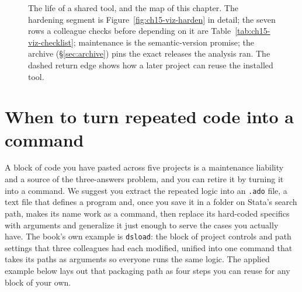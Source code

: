 \documentclass[
    a4paper,
    fontsize=10pt,
    twoside=true,
    numbers=noenddot,
]{kaobook}
\begin{document}
\begin{figure}[htbp]
\centering
{}
\caption[The life of a shared tool]{The life of a shared tool, and the map of this chapter. The hardening segment is Figure~\ref{fig:ch15-viz-harden} in detail; the seven rows a colleague checks before depending on it are Table~\ref{tab:ch15-viz-checklist}; maintenance is the semantic-version promise; the archive (\S\ref{sec:archive}) pins the exact releases the analysis ran. The dashed return edge shows how a later project can reuse the installed tool.}
\label{fig:ch15-viz-lifecycle}
\end{figure}

\section{When to turn repeated code into a command}
A block of code you have pasted across five projects is a maintenance liability and a source of the three-answers problem, and you can retire it by turning it into a command. We suggest you extract the repeated logic into an \texttt{.ado} file, a text file that defines a program and, once you save it in a folder on Stata's search path, makes its name work as a command, then replace its hard-coded specifics with arguments and generalize it just enough to serve the cases you actually have. The book's own example is \texttt{dsload}: the block of project controls and path settings that three colleagues had each modified, unified into one command that takes its paths as arguments so everyone runs the same logic. The applied example below lays out that packaging path as four steps you can reuse for any block of your own.
\end{document}
